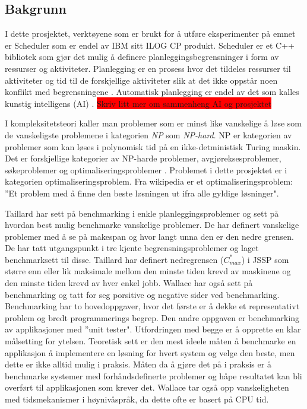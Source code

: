 \subsection{Bakgrunn}
I dette prosjektet, verktøyene som er brukt for å utføre eksperimenter på emnet er Scheduler som er endel av IBM sitt ILOG CP produkt. Scheduler er et C++ bibliotek som gjør det mulig å definere planleggingsbegrensninger i form av ressurser og aktiviteter. Planlegging er en prosess hvor det tildeles ressurser til aktiviteter og tid til de forskjellige aktiviteter slik at det ikke oppstår noen konflikt med begrensningene \cite{Pape94implementationof}. Automatisk planlegging er endel av det som kalles kunstig intelligens (AI) . \colorbox{red}{Skriv litt mer om sammenheng AI og prosjektet}

I kompleksitetsteori \cite{compcomplextheory} kaller man problemer som er minst like vanskelige å løse som de vanskeligste problemene i kategorien \textit{NP} som \textit{NP-hard}. NP er kategorien av problemer som kan løses i polynomisk tid på en ikke-detministisk Turing  maskin. Det er forskjellige kategorier av NP-harde problemer, avgjøreksesproblemer, søkeproblemer og optimaliseringsproblemer \cite{nphardwikipedia}. Problemet i dette prosjektet er i kategorien optimaliseringsproblem. Fra wikipedia \cite{optimizationproblemwiki} er et optimaliseringsproblem: ''Et problem med å finne den beste løsningen ut ifra alle gyldige løsninger".

Taillard \cite{Taillard1993278} har sett på benchmarking i enkle planleggingsproblemer og sett på hvordan best mulig benchmarke vanskelige problemer. De har definert vanskelige problemer med å se på makespan og hvor langt unna den er den nedre grensen. De har tatt utgangspunkt i tre kjente begrensningsproblemer og laget benchmarksett til disse. Taillard har definert nedregrensen ($ C^{*}_{max} $) i JSSP som større enn eller lik maksimale mellom den minste tiden krevd av maskinene og den minste tiden krevd av hver enkel jobb. Wallace \cite{Wallace:2004:BCL:956860.956861} har også sett på benchmarking og tatt for seg porsitive og negative sider ved benchmarking. Benchmarking har to hovedoppgaver, hvor det første er å dekke et representativt problem og bredt programmerings begrep. Den andre oppgaven er benchmarking av applikasjoner med ''unit tester". Utfordringen med begge er å opprette en klar målsetting for ytelsen. Teoretisk sett er den mest ideele måten å benchmarke en applikasjon å implementere en løsning for hvert system og velge den beste, men dette er ikke alltid mulig i praksis. Måten da å gjøre det på i praksis er å benchmarke systemer med forhåndsdefinerte problemer og håpe resultatet kan bli overført til applikasjonen som krever det. Wallace tar også opp vanskeligheten med tidsmekanismer i høynivåspråk, da dette ofte er basert på CPU tid.